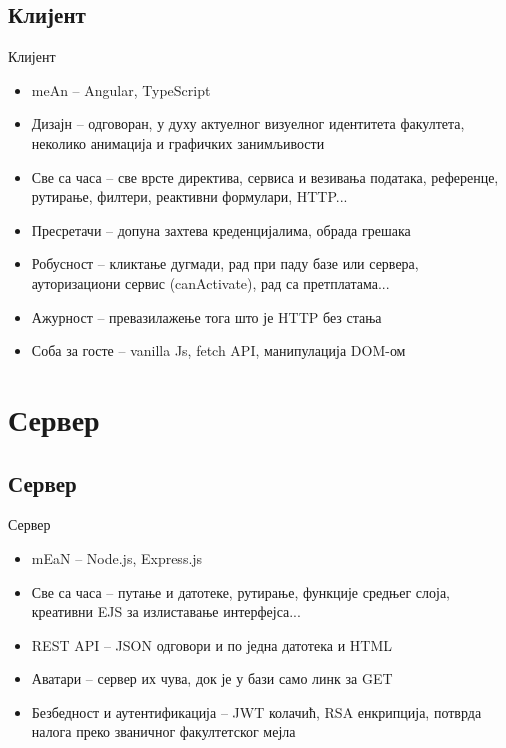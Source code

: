 \documentclass[hyperref={bookmarks=false}]{beamer}
\begin{document}
\subsection{Клијент}
\begin{frame}{Клијент}
\begin{itemize}
\item meAn -- Angular, TypeScript

\item Дизајн -- одговоран, у духу актуелног визуелног идентитета факултета, неколико анимација и графичких занимљивости

\item Све са часа -- све врсте директива, сервиса и везивања података, референце, рутирање, филтери, реактивни формулари, HTTP...

\item Пресретачи -- допуна захтева креденцијалима, обрада грешака

\item Робусност -- кликтање дугмади, рад при паду базе или сервера, ауторизациони сервис (canActivate), рад са претплатама...

\item Ажурност -- превазилажење тога што је HTTP без стања

\item Соба за госте -- vanilla Js, fetch API, манипулација DOM-ом
\end{itemize}
\end{frame}

\section{Сервер}
\subsection{Сервер}
\begin{frame}{Сервер}
\begin{itemize}
\item mEaN -- Node.js, Express.js

\item Све са часа --  путање и датотеке, рутирање, функције средњег слоја, креативни EJS за излиставање интерфејса...

\item REST API -- JSON одговори и по једна датотека и HTML

\item Аватари -- сервер их чува, док је у бази само линк за GET

\item Безбедност и аутентификација -- JWT колачић, RSA енкрипција, потврда налога преко званичног факултетског мејла

\end{itemize}
\end{frame}
\end{document}
